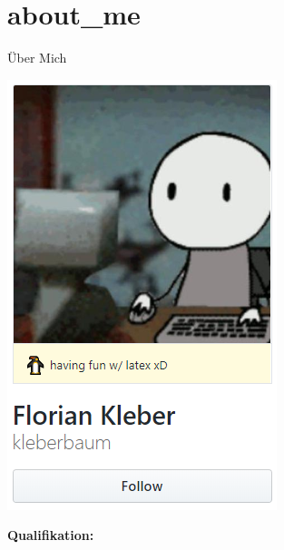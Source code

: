 \documentclass[10pt, unknownkeysallowed]{beamer}
\begin{document}
\section{about_me}
\begin{frame}{Über Mich}
\begin{minipage}{.45\textwidth}
	\includegraphics[width=\linewidth]{chrome_2019-05-17_13-24-38.png}
	\vspace*{-16px}
	\\
\end{minipage}
\hfill\vline\hfill
\begin{minipage}{.45\textwidth}
    \vspace*{-20px}
	\textbf{Qualifikation:}

\end{minipage}
\end{frame}
\end{document}
